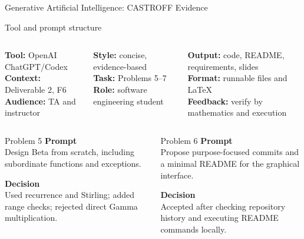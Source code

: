 \documentclass[aspectratio=169,10pt]{beamer}
\begin{document}
\begin{frame}[t]{Generative Artificial Intelligence: CASTROFF Evidence}
  \vspace{0.2em}
  \begin{block}{Tool and prompt structure}
    \scriptsize
    \begin{columns}[T,onlytextwidth]
      \textbf{Tool:} OpenAI ChatGPT/Codex\\
      \textbf{Context:} Deliverable 2, F6\\
      \textbf{Audience:} TA and instructor

      \textbf{Style:} concise, evidence-based\\
      \textbf{Task:} Problems 5--7\\
      \textbf{Role:} software engineering student

      \textbf{Output:} code, README, requirements, slides\\
      \textbf{Format:} runnable files and LaTeX\\
      \textbf{Feedback:} verify by mathematics and execution
    \end{columns}
  \end{block}

  \vspace{0.25em}
  \begin{columns}[T,onlytextwidth]
    \begin{block}{Problem 5}
      \scriptsize
      \textbf{Prompt}\\
      Design Beta from scratch, including subordinate functions and exceptions.

      \vspace{0.35em}
      \textbf{Decision}\\
      Used recurrence and Stirling; added range checks; rejected direct Gamma
      multiplication.
    \end{block}

    \begin{block}{Problem 6}
      \scriptsize
      \textbf{Prompt}\\
      Propose purpose-focused commits and a minimal README for the graphical
      interface.

      \vspace{0.35em}
      \textbf{Decision}\\
      Accepted after checking repository history and executing README commands
      locally.
    \end{block}


\end{columns}
\end{frame}
\end{document}
